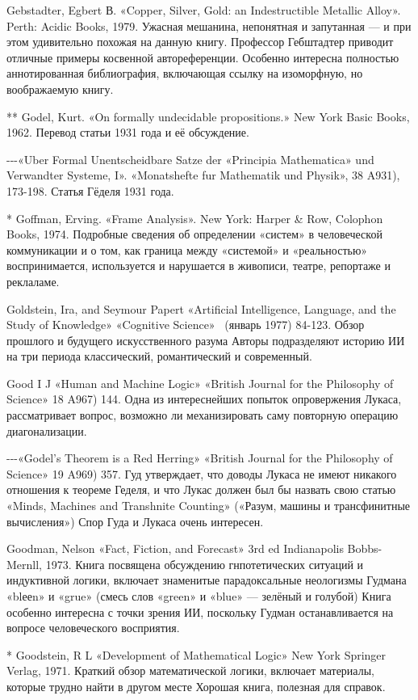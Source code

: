 Gebstadter, Egbert В. «Copper, Silver, Gold: an Indestructible Metallic Alloy». Perth: Acidic Books, 1979. Ужасная мешанина, непонятная и запутанная --- и при этом удивительно похожая на данную книгу. Профессор Гебштадтер приводит отличные примеры косвенной автореференции. Особенно интересна полностью аннотированная библиография, включающая ссылку на изоморфную, но воображаемую книгу.

** Godel, Kurt. «On formally undecidable propositions.» New York Basic Books, 1962. Перевод статьи 1931 года и её обсуждение.

-\/-\/-«Uber Formal Unentscheidbare Satze der «Principia Mathematica» und Verwandter Systeme, I». «Monatshefte fur Mathematik und Physik», 38 A931), 173-198. Статья Гёделя 1931 года.

* Goffman, Erving. «Frame Analysis». New York: Harper \& Row, Colophon Books, 1974. Подробные сведения об определении «систем» в человеческой коммуникации и о том, как граница между «системой» и «реальностью» воспринимается, используется и нарушается в живописи, театре, репортаже и реклаламе.

Goldstein, Ira, and Seymour Papert «Artificial Intelligence, Language, and the Study of Knowledge» «Cognitive Science»~ (январь 1977) 84-123. Обзор прошлого и будущего искусственного разума Авторы подразделяют историю ИИ на три периода классический, романтический и современный.

Good I J «Human and Machine Logic» «British Journal for the Philosophy of Science» 18 A967) 144. Одна из интереснейших попыток опровержения Лукаса, рассматривает вопрос, возможно ли механизировать саму повторную операцию диагонализации.

-\/-\/-«Godel's Theorem is a Red Herring» «British Journal for the Philosophy of Science» 19 A969) 357. Гуд утверждает, что доводы Лукаса не имеют никакого отношения к теореме Геделя, и что Лукас должен был бы назвать свою статью «Minds, Machines and Transhnite Counting» («Разум, машины и трансфинитные вычисления») Спор Гуда и Лукаса очень интересен.

Goodman, Nelson «Fact, Fiction, and Forecast» 3rd ed Indianapolis Bobbs-Mernll, 1973. Книга посвящена обсуждению гнпотетических ситуаций и индуктивной логики, включает знаменитые парадоксальные неологизмы Гудмана «blееn» и «grue» (смесь слов «green» и «blue» --- зелёный и голубой) Книга особенно интересна с точки зрения ИИ, поскольку Гудман останавливается на вопросе человеческого восприятия.

* Goodstein, R L «Development of Mathematical Logic» New York Springer Verlag, 1971. Краткий обзор математической логики, включает материалы, которые трудно найти в другом месте Хорошая книга, полезная для справок.

